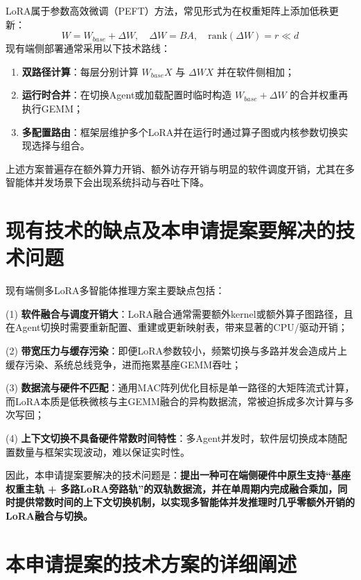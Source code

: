 \documentclass[12pt,a4paper]{article}
\begin{document}
LoRA属于参数高效微调（PEFT）方法，常见形式为在权重矩阵上添加低秩更新：
\[
W = W_{base} + \Delta W,\quad \Delta W = BA,\quad \mathrm{rank}(\Delta W)=r \ll d
\]
现有端侧部署通常采用以下技术路线：
\begin{enumerate}
    \item \textbf{双路径计算}：每层分别计算 $W_{base}X$ 与 $\Delta WX$ 并在软件侧相加；
    \item \textbf{运行时合并}：在切换Agent或加载配置时临时构造 $W_{base}+\Delta W$ 的合并权重再执行GEMM；
    \item \textbf{多配置路由}：框架层维护多个LoRA并在运行时通过算子图或内核参数切换实现选择与组合。
\end{enumerate}
上述方案普遍存在额外算力开销、额外访存开销与明显的软件调度开销，尤其在多智能体并发场景下会出现系统抖动与吞吐下降。

\section{现有技术的缺点及本申请提案要解决的技术问题}

现有端侧多LoRA多智能体推理方案主要缺点包括：

(1) \textbf{软件融合与调度开销大}：LoRA融合通常需要额外kernel或额外算子图路径，且在Agent切换时需要重新配置、重建或更新映射表，带来显著的CPU/驱动开销；

(2) \textbf{带宽压力与缓存污染}：即便LoRA参数较小，频繁切换与多路并发会造成片上缓存污染、系统总线竞争，进而拖累基座GEMM吞吐；

(3) \textbf{数据流与硬件不匹配}：通用MAC阵列优化目标是单一路径的大矩阵流式计算，而LoRA本质是低秩微核与主GEMM融合的异构数据流，常被迫拆成多次计算与多次写回；

(4) \textbf{上下文切换不具备硬件常数时间特性}：多Agent并发时，软件层切换成本随配置数量与框架实现波动，难以保证实时性。

因此，本申请提案要解决的技术问题是：\textbf{提出一种可在端侧硬件中原生支持“基座权重主轨 + 多路LoRA旁路轨”的双轨数据流，并在单周期内完成融合乘加，同时提供常数时间的上下文切换机制，以实现多智能体并发推理时几乎零额外开销的LoRA融合与切换。}

\section{本申请提案的技术方案的详细阐述}
\end{document}
